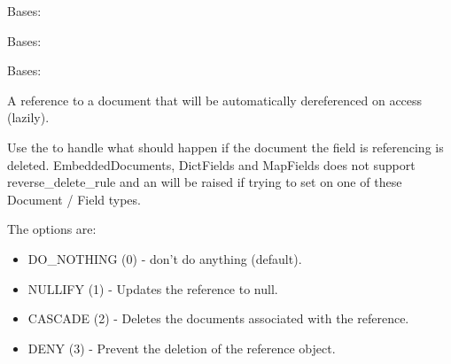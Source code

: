 \documentclass[letterpaper,10pt,english]{sphinxmanual}
\begin{document}
\begin{fulllineitems}
\label{\detokenize{edge:edge.Edge}}
Bases: 

\begin{fulllineitems}
\label{\detokenize{edge:edge.Edge.DoesNotExist}}
Bases: 

\end{fulllineitems}


\begin{fulllineitems}
\label{\detokenize{edge:edge.Edge.MultipleObjectsReturned}}
Bases: 

\end{fulllineitems}


\begin{fulllineitems}
\label{\detokenize{edge:edge.Edge.from_node}}
A reference to a document that will be automatically dereferenced on
access (lazily).

Use the  to handle what should happen if the document
the field is referencing is deleted.  EmbeddedDocuments, DictFields and
MapFields does not support reverse\_delete\_rule and an 
will be raised if trying to set on one of these Document / Field types.

The options are:
\begin{itemize}
\item {} 
DO\_NOTHING (0)  - don't do anything (default).

\item {} 
NULLIFY    (1)  - Updates the reference to null.

\item {} 
CASCADE    (2)  - Deletes the documents associated with the reference.

\item {} 
DENY       (3)  - Prevent the deletion of the reference object.


\end{itemize}
\end{fulllineitems}
\end{fulllineitems}
\end{document}
